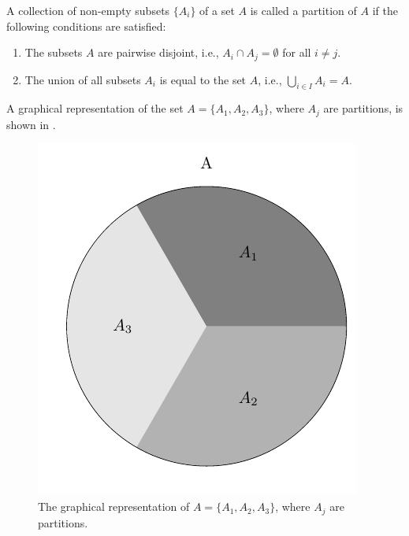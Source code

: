 \begin{definition}[Partition]
	A collection of non-empty subsets $\{A_i\}$ of a set $A$ is called a partition of $A$ if the following conditions are satisfied:
	\begin{enumerate}
		\item The subsets $A$ are pairwise disjoint, i.e., $A_i \cap A_j = \emptyset$ for all \(i \neq j\).
		\item The union of all subsets \(A_i\) is equal to the set \(A\), i.e., \(\bigcup_{i \in I} A_i = A\).
	\end{enumerate}
	
	A graphical representation of the set $A=\{A_1,A_2,A_3\}$, where $A_j$ are partitions, is shown in .
	\begin{figure}[h]
		\centering
		\includegraphics[]{figures/set_partition.pdf}
		\caption{The graphical representation of $A=\{A_1,A_2,A_3\}$, where $A_j$ are partitions.}
		\label{fig:set_partition}
	\end{figure}
\end{definition}






	
